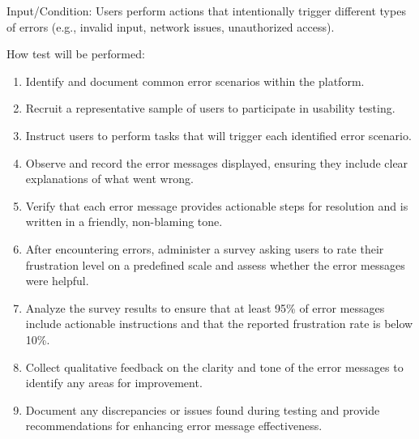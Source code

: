 \documentclass[12pt, titlepage]{article}
\begin{document}
\begin{enumerate}
Input/Condition: Users perform actions that intentionally trigger different types of errors (e.g., invalid input, network issues, unauthorized access).

How test will be performed:
\begin{enumerate}
    \item Identify and document common error scenarios within the platform.
    \item Recruit a representative sample of users to participate in usability testing.
    \item Instruct users to perform tasks that will trigger each identified error scenario.
    \item Observe and record the error messages displayed, ensuring they include clear explanations of what went wrong.
    \item Verify that each error message provides actionable steps for resolution and is written in a friendly, non-blaming tone.
    \item After encountering errors, administer a survey asking users to rate their frustration level on a predefined scale and assess whether the error messages were helpful.
    \item Analyze the survey results to ensure that at least 95\% of error messages include actionable instructions and that the reported frustration rate is below 10\%.
    \item Collect qualitative feedback on the clarity and tone of the error messages to identify any areas for improvement.
    \item Document any discrepancies or issues found during testing and provide recommendations for enhancing error message effectiveness.
\end{enumerate}


\end{enumerate}

\end{document}
